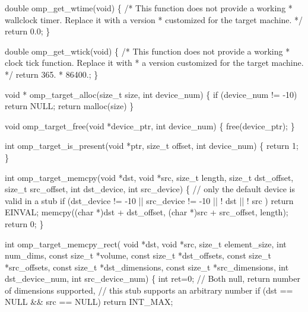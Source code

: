 {\begin{codepar}
double omp\_get\_wtime(void)
\{
/* This function does not provide a working
 * wallclock timer. Replace it with a version
 * customized for the target machine.
 */
    return 0.0;
\}

double omp\_get\_wtick(void)
\{
/* This function does not provide a working
 * clock tick function. Replace it with
 * a version customized for the target machine.
 */
    return 365. * 86400.;
\}

void * omp\_target\_alloc(size\_t size, int device\_num)
\{
    if (device\_num != -10)
      return NULL;
    return malloc(size)
\}

void omp\_target\_free(void *device\_ptr, int device\_num)
\{
    free(device\_ptr);
\}

int omp\_target\_is\_present(void *ptr, size\_t offset,
                             int device\_num)
\{
    return 1;
\}

int omp\_target\_memcpy(void *dst, void *src, size\_t length,
                      size\_t dst\_offset, size\_t src\_offset,
                      int dst\_device, int src\_device)
\{
    // only the default device is valid in a stub
    if (dst\_device != -10 || src\_device != -10
            || ! dst || ! src )
        return EINVAL;
    memcpy((char *)dst + dst\_offset,
           (char *)src + src\_offset,
           length);
    return 0;
\}

int omp\_target\_memcpy\_rect(
    void *dst, void *src,
    size\_t element\_size,
    int num\_dims,
    const size\_t *volume,
    const size\_t *dst\_offsets,
    const size\_t *src\_offsets,
    const size\_t *dst\_dimensions,
    const size\_t *src\_dimensions,
    int dst\_device\_num, int src\_device\_num)
\{
    int ret=0;
    // Both null, return number of dimensions supported,
    // this stub supports an arbitrary number
    if (dst == NULL && src == NULL) return INT\_MAX;


\end{codepar}}
